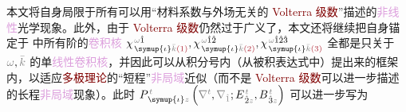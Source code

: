 本文将自身局限于所有可以用“材料系数与外场无关的 \textcolor{Maroon}{Volterra 级数}\cite{pintoExactVolterraseriesComputation1982,shenNonlinearOpticalSusceptibilities2001}”描述的\textcolor{Plum}{非线性}\textcolor{NavyBlue}{光学}现象。此外，由于 \textcolor{Maroon}{Volterra 级数}仍然过于广义了，本文还将继续把自身锚定于  中所有阶的\textcolor{Plum}{卷积核} $\chi^{\;\! \mathcolor{gray}{\omega} \hat{1}}_{\;\! \symup{\iota} \mathcolor{gray}{\bar{k}} \textcolor{Maroon}{(1)}}, \chi^{\;\! \mathcolor{gray}{\omega} \hat{1} \hat{2}}_{\;\! \symup{\iota} \mathcolor{gray}{\bar{k}} \textcolor{Maroon}{(2)}}, \chi^{\;\! \mathcolor{gray}{\omega} \hat{1} \hat{2} \hat{3}}_{\;\! \symup{\iota} \mathcolor{gray}{\bar{k}} \textcolor{Maroon}{(3)}}$ 全都是只关于 $\mathcolor{gray}{\omega}, \mathcolor{gray}{\bar{k}}$ 的单\textcolor{Plum}{线性卷积核}，并因此可以从积分号内（从被积表达式中）提出来的框架内，以适应\textcolor{Maroon}{多极理论}的“短程”\textcolor{Plum}{非局域}近似（而不是 \textcolor{Maroon}{Volterra 级数}可以进一步描述的长程\textcolor{Plum}{非局域}现象）。此时 $P^{\;\!\mathcolor{gray}{t}}_{\;\! \symup{\iota}\mathcolor{gray}{z}} \left( \mathcolor{gray}{\nabla^t}, \mathcolor{gray}{\nabla_{\hat{1}}} ; E^{\;\!\mathcolor{gray}{t}}_{\;\! \hat{2}\mathcolor{gray}{z}}, B^{\;\!\mathcolor{gray}{t}}_{\;\! \hat{3}\mathcolor{gray}{z}} \right)$ 可以进一步写为\cite{teixeiraOpticalTransmissionModeling2013,andreasczylwikNonlinearSystemModeling1986,shenNonlinearOpticalSusceptibilities2001,zalevskyOpticalImplementationSecondorder2001,zhangNonlinearQuantumInputoutput2014}
